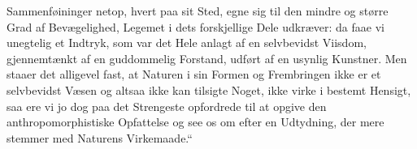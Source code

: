 \documentclass[12pt,a4paper]{book}
\begin{document}

\setcounter{footnote}{0}
Sammenføininger netop, hvert paa sit Sted, egne sig til den mindre og større
Grad af Bevægelighed, Legemet i dets forskjellige Dele udkræver: da faae vi
unegtelig et Indtryk, som var det Hele anlagt af en selvbevidst Viisdom,
gjennemtænkt af en guddommelig Forstand, udført af en usynlig Kunstner. Men
staaer det alligevel fast, at Naturen i sin Formen og Frembringen ikke er et
selvbevidst Væsen og altsaa ikke kan tilsigte Noget, ikke virke i bestemt
Hensigt, saa ere vi jo dog paa det Strengeste opfordrede til at opgive den
anthropomorphistiske Opfattelse og see os om efter en Udtydning, der mere
stemmer med Naturens Virkemaade.“
\end{document}
